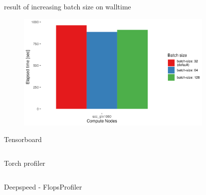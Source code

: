 \documentclass[compress,aspectratio=169]{beamer}
\begin{document}
\begin{frame}{result of increasing batch size on walltime}
    \vspace{-1em}
    \begin{center}
        \begin{figure}
            \includegraphics[width=0.85\textwidth]{../../data/sacct_barplot_by_nodes_batch-size-effect}

        \end{figure}
    \end{center}
\end{frame}

\begin{frame}[fragile]{Tensorboard}
        \footnotesize\inputminted[xleftmargin=1em,linenos,fontsize=\scriptsize, highlightlines={1,3,9-12,14-16}]{python}{../../data/tensorboard.py}
\end{frame}

\begin{frame}[fragile]{Torch profiler}
        \footnotesize\inputminted[xleftmargin=1em,linenos,fontsize=\scriptsize, highlightlines={4-10,14,15}]{python}{../../data/profiler-torch.py}
\end{frame}

\begin{frame}[fragile]{Deepspeed - FlopsProfiler}
        \footnotesize\inputminted[xleftmargin=1em,linenos,fontsize=\scriptsize, highlightlines={1,3,4,8,9,11-18}]{python}{../../data/deepspeed.py}
\end{frame}
\end{document}
